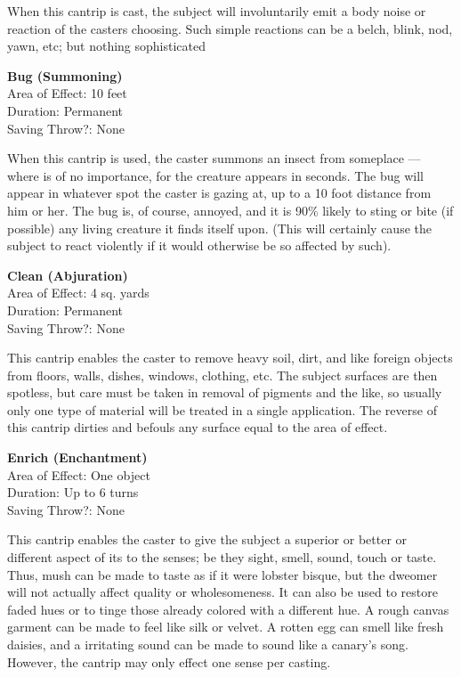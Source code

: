 \documentclass[letterpaper,sansserif,tightsqueeze]{rpg-module}
\begin{document}
When this cantrip is cast, the subject will involuntarily emit a body noise or reaction of the casters choosing. Such simple reactions can be a belch, blink, nod, yawn, etc; but nothing sophisticated
	
\textbf{Bug (Summoning)}\\
Area of Effect: 10 feet\\
Duration: Permanent\\
Saving Throw?: None

When this cantrip is used, the caster summons an insect from someplace — where is of no importance, for the creature appears in seconds. The bug will appear in whatever spot the caster is gazing at, up to a 10 foot distance from him or her. The bug is, of course, annoyed, and it is 90\% likely to sting or bite (if possible) any living creature it finds itself upon. (This will certainly cause the subject to react violently if it would otherwise be so affected by such).
	
\textbf{Clean (Abjuration)}\\
Area of Effect: 4 sq. yards\\
Duration: Permanent\\
Saving Throw?: None
	
This cantrip enables the caster to remove heavy soil, dirt, and like foreign objects from floors, walls, dishes, windows, clothing, etc. The subject surfaces are then spotless, but care must be taken in removal of pigments and the like, so usually only one type of material will be treated in a single application. The reverse of this cantrip dirties and befouls any surface equal to the area of effect.
	
\textbf{Enrich (Enchantment)}\\
Area of Effect: One object\\
Duration: Up to 6 turns\\
Saving Throw?: None

This cantrip enables the caster to give the subject a superior or better or different aspect of its to the senses; be they sight, smell, sound, touch or taste. Thus, mush can be made to taste as if it were lobster bisque, but the dweomer will not actually affect quality or wholesomeness. It can also be used to restore faded hues or to tinge those already colored with a different hue. A rough canvas garment can be made to feel like silk or velvet. A rotten egg can smell like fresh daisies, and a irritating sound can be made to sound like a canary’s song. However, the cantrip may only effect one sense per casting.
	
\end{document}
